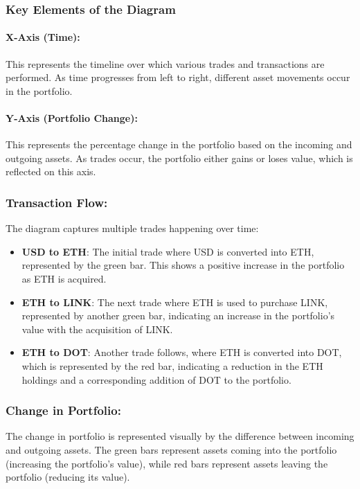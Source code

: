 \documentclass{article}
\begin{document}
\subsubsection*{Key Elements of the Diagram}

\paragraph{X-Axis (Time):}
This represents the timeline over which various trades and transactions are performed. As time progresses from left to right, different asset movements occur in the portfolio.

\paragraph{Y-Axis (Portfolio Change):}
This represents the percentage change in the portfolio based on the incoming and outgoing assets. As trades occur, the portfolio either gains or loses value, which is reflected on this axis.

\subsubsection*{Transaction Flow:}

The diagram captures multiple trades happening over time:
\begin{itemize}
    \item \textbf{USD to ETH}: The initial trade where USD is converted into ETH, represented by the green bar. This shows a positive increase in the portfolio as ETH is acquired.
    \item \textbf{ETH to LINK}: The next trade where ETH is used to purchase LINK, represented by another green bar, indicating an increase in the portfolio’s value with the acquisition of LINK.
    \item \textbf{ETH to DOT}: Another trade follows, where ETH is converted into DOT, which is represented by the red bar, indicating a reduction in the ETH holdings and a corresponding addition of DOT to the portfolio.
\end{itemize}

\subsubsection*{Change in Portfolio:}
The change in portfolio is represented visually by the difference between incoming and outgoing assets. The green bars represent assets coming into the portfolio (increasing the portfolio’s value), while red bars represent assets leaving the portfolio (reducing its value).
\end{document}
